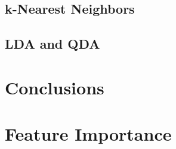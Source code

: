 \documentclass{article}
\begin{document}


\subsection{k-Nearest Neighbors}



\subsection{LDA and QDA}



\section{Conclusions}



\section{Feature Importance}


\end{document}

